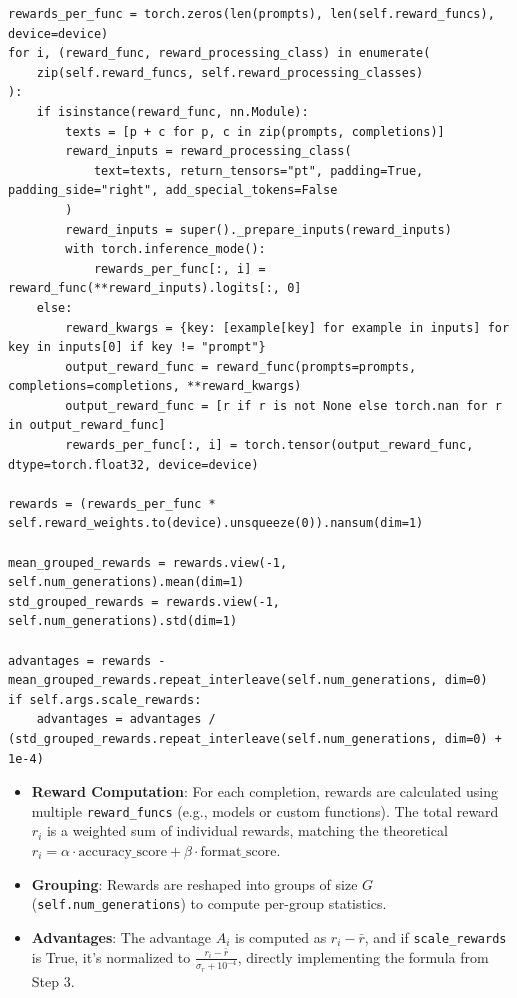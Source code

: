 \documentclass{article}
\begin{document}
\begin{verbatim}
rewards_per_func = torch.zeros(len(prompts), len(self.reward_funcs), device=device)
for i, (reward_func, reward_processing_class) in enumerate(
    zip(self.reward_funcs, self.reward_processing_classes)
):
    if isinstance(reward_func, nn.Module):
        texts = [p + c for p, c in zip(prompts, completions)]
        reward_inputs = reward_processing_class(
            text=texts, return_tensors="pt", padding=True, padding_side="right", add_special_tokens=False
        )
        reward_inputs = super()._prepare_inputs(reward_inputs)
        with torch.inference_mode():
            rewards_per_func[:, i] = reward_func(**reward_inputs).logits[:, 0]
    else:
        reward_kwargs = {key: [example[key] for example in inputs] for key in inputs[0] if key != "prompt"}
        output_reward_func = reward_func(prompts=prompts, completions=completions, **reward_kwargs)
        output_reward_func = [r if r is not None else torch.nan for r in output_reward_func]
        rewards_per_func[:, i] = torch.tensor(output_reward_func, dtype=torch.float32, device=device)

rewards = (rewards_per_func * self.reward_weights.to(device).unsqueeze(0)).nansum(dim=1)

mean_grouped_rewards = rewards.view(-1, self.num_generations).mean(dim=1)
std_grouped_rewards = rewards.view(-1, self.num_generations).std(dim=1)

advantages = rewards - mean_grouped_rewards.repeat_interleave(self.num_generations, dim=0)
if self.args.scale_rewards:
    advantages = advantages / (std_grouped_rewards.repeat_interleave(self.num_generations, dim=0) + 1e-4)
\end{verbatim}

\begin{itemize}
    \item \textbf{Reward Computation}: For each completion, rewards are calculated using multiple \texttt{reward\_funcs} (e.g., models or custom functions). The total reward \( r_i \) is a weighted sum of individual rewards, matching the theoretical \( r_i = \alpha \cdot \text{accuracy\_score} + \beta \cdot \text{format\_score} \).
    
    \item \textbf{Grouping}: Rewards are reshaped into groups of size \( G \) (\texttt{self.num\_generations}) to compute per-group statistics.
    
    \item \textbf{Advantages}: The advantage \( A_i \) is computed as \( r_i - \bar{r} \), and if \texttt{scale\_rewards} is True, it’s normalized to \( \frac{r_i - \bar{r}}{\sigma_r + 10^{-4}} \), directly implementing the formula from Step 3.
\end{itemize}
\end{document}
